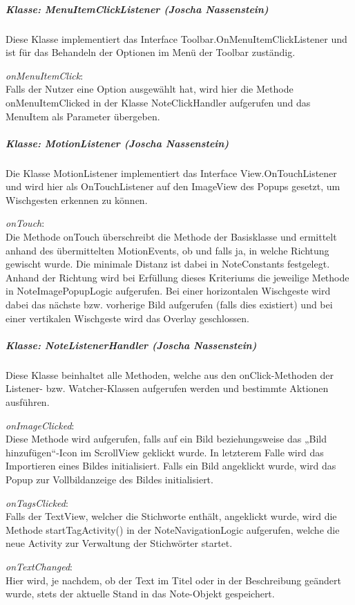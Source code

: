\subparagraph{Klasse: MenuItemClickListener (Joscha Nassenstein)}
Diese Klasse implementiert das Interface Toolbar.OnMenuItemClickListener und ist für das Behandeln der Optionen im Menü der Toolbar zuständig.

\textit{onMenuItemClick}:\\
Falls der Nutzer eine Option ausgewählt hat, wird hier die Methode onMenuItemClicked in der Klasse NoteClickHandler aufgerufen und das MenuItem als Parameter übergeben.

\subparagraph{Klasse: MotionListener (Joscha Nassenstein)}
Die Klasse MotionListener implementiert das Interface View.OnTouchListener und wird hier als OnTouchListener auf den ImageView des Popups gesetzt, um Wischgesten erkennen zu können.

\textit{onTouch}:\\
Die Methode onTouch überschreibt die Methode der Basisklasse und ermittelt anhand des übermittelten MotionEvents, ob und falls ja, in welche Richtung gewischt wurde. Die minimale Distanz ist dabei in NoteConstants festgelegt. Anhand der Richtung wird bei Erfüllung dieses Kriteriums die jeweilige Methode in NoteImagePopupLogic aufgerufen. Bei einer horizontalen Wischgeste wird dabei das nächste bzw. vorherige Bild aufgerufen (falls dies existiert) und bei einer vertikalen Wischgeste wird das Overlay geschlossen.

\subparagraph{Klasse: NoteListenerHandler (Joscha Nassenstein)}
Diese Klasse beinhaltet alle Methoden, welche aus den onClick-Methoden der Listener- bzw. Watcher-Klassen aufgerufen werden und bestimmte Aktionen ausführen.

\textit{onImageClicked}:\\
Diese Methode wird aufgerufen, falls auf ein Bild beziehungsweise das „Bild hinzufügen“-Icon im ScrollView geklickt wurde. In letzterem Falle wird das Importieren eines Bildes initialisiert. Falls ein Bild angeklickt wurde, wird das Popup zur Vollbildanzeige des Bildes initialisiert.

\textit{onTagsClicked}:\\
Falls der TextView, welcher die Stichworte enthält, angeklickt wurde, wird die Methode startTagActivity() in der NoteNavigationLogic aufgerufen, welche die neue Activity zur Verwaltung der Stichwörter startet.

\textit{onTextChanged}:\\
Hier wird, je nachdem, ob der Text im Titel oder in der Beschreibung geändert wurde, stets der aktuelle Stand in das Note-Objekt gespeichert.

